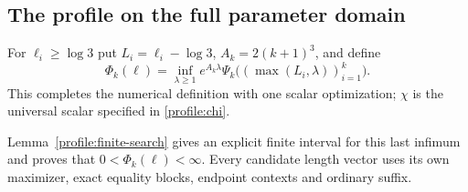 \subsection{The profile on the full parameter domain}
For $\ell_i\geq\log3$ put $L_i=\ell_i-\log3$, $A_k=2(k+1)^3$,
and define
\begin{equation}
 \Phi_k(\ell)=\inf_{\lambda\geq1}
     e^{A_k\lambda}\Psi_k\big((\max(L_i,\lambda))_{i=1}^k\big).
 \label{profile:final}
\end{equation}
This completes the numerical definition with one scalar optimization;
$\chi$ is the universal scalar specified in \eqref{profile:chi}.


Lemma~\ref{profile:finite-search} gives an explicit finite interval for
this last infimum and proves that $0<\Phi_k(\ell)<\infty$.
Every candidate length vector uses its own maximizer, exact equality
blocks, endpoint contexts and ordinary suffix.
